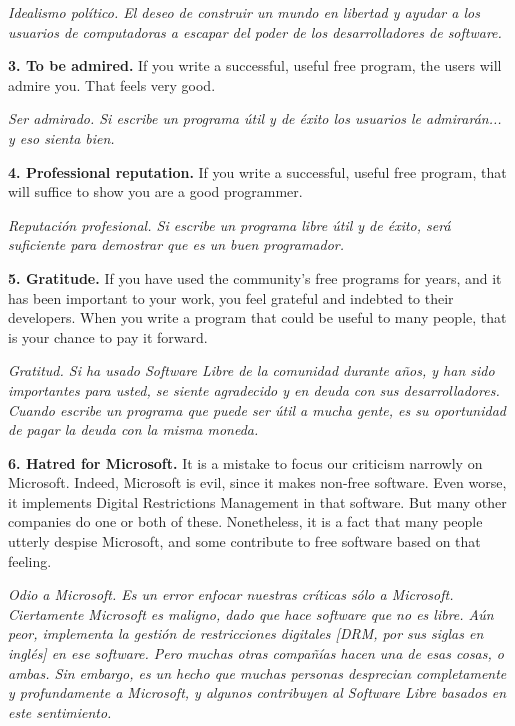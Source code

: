 \textit{Idealismo político. El deseo de construir un mundo en libertad y ayudar a los usuarios de computadoras a escapar del poder de los desarrolladores de software.}\vspace{0.4cm} 

{\bf 3. To be admired.} If you write a successful, useful free program, the users will admire you. That feels very good.

\textit{Ser admirado. Si escribe un programa útil y de éxito los usuarios le admirarán... y eso sienta bien.}\vspace{0.4cm} 

{\bf 4. Professional reputation.} If you write a successful, useful free program, that will suffice to show you are a good programmer.

\textit{Reputación profesional. Si escribe un programa libre útil y de éxito, será suficiente para demostrar que es un buen programador.}\vspace{0.4cm} 

{\bf 5. Gratitude.} If you have used the community's free programs for years, and it has been important to your work, you feel grateful and indebted to their developers. When you write a program that could be useful to many people, that is your chance to pay it forward.

\textit{Gratitud. Si ha usado \textit{Software Libre} de la comunidad durante años, y han sido importantes para usted, se siente agradecido y en deuda con sus desarrolladores. Cuando escribe un programa que puede ser útil a mucha gente, es su oportunidad de pagar la deuda con la misma moneda.}\vspace{0.4cm} 

{\bf 6. Hatred for Microsoft.}  It is a mistake to focus our criticism narrowly on Microsoft. Indeed, Microsoft is evil, since it makes non-free software. Even worse, it implements Digital Restrictions Management in that software. But many other companies do one or both of these. Nonetheless, it is a fact that many people utterly despise Microsoft, and some contribute to free software based on that feeling.

\textit{Odio a Microsoft. Es un error enfocar nuestras críticas sólo a Microsoft. Ciertamente Microsoft es maligno, dado que hace software que no es libre. Aún peor, implementa la gestión de restricciones digitales [DRM, por sus siglas en inglés] en ese software. Pero muchas otras compañías hacen una de esas cosas, o ambas. Sin embargo, es un hecho que muchas personas desprecian completamente y profundamente a Microsoft, y algunos contribuyen al \textit{Software Libre} basados en este sentimiento.}\vspace{0.4cm} 

